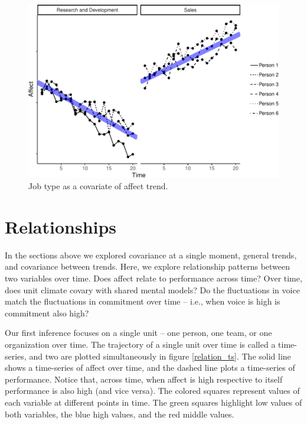 \documentclass[english,,man]{apa6}
\theoremstyle{definition}
\theoremstyle{definition}
\theoremstyle{definition}
\theoremstyle{remark}
\begin{document}
\begin{figure}
\centering
\includegraphics{figures/unnamed-chunk-15-1.pdf}
\caption{\label{fig:unnamed-chunk-15}Job type as a covariate of affect
trend.\label{trend_covariate}}
\end{figure}

\hypertarget{relationships}{%
\section{Relationships}\label{relationships}}

In the sections above we explored covariance at a single moment, general
trends, and covariance between trends. Here, we explore relationship
patterns between two variables over time. Does affect relate to
performance across time? Over time, does unit climate covary with shared
mental models? Do the fluctuations in voice match the fluctuations in
commitment over time -- i.e., when voice is high is commitment also
high?

Our first inference focuses on a single unit -- one person, one team, or
one organization over time. The trajectory of a single unit over time is
called a time-series, and two are plotted simultaneously in figure
\ref{relation_ts}. The solid line shows a time-series of affect over
time, and the dashed line plots a time-series of performance. Notice
that, across time, when affect is high respective to itself performance
is also high (and vice versa). The colored squares represent values of
each variable at different points in time. The green squares highlight
low values of both variables, the blue high values, and the red middle
values.
\end{document}
